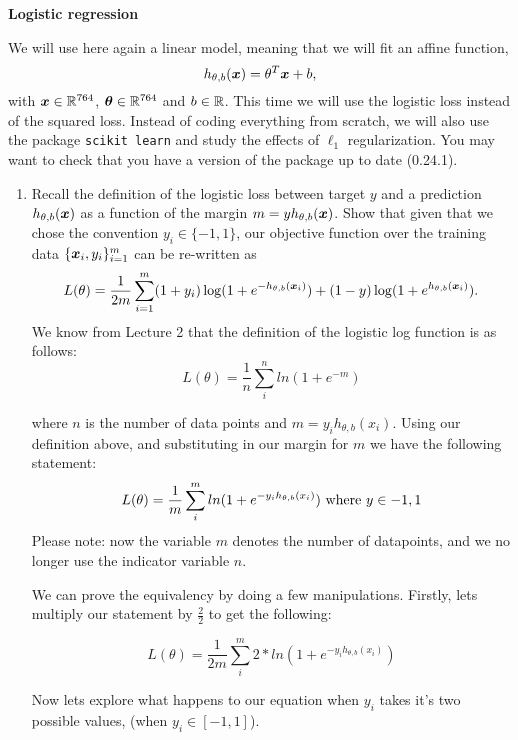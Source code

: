 \documentclass{article}
\begin{document}
{\color{nyupurple} \large \bf Logistic regression}  

We will use here again a linear model, meaning that we will fit an affine function,
\[
h_{\theta, b}(\boldsymbol{x}) = \theta^T\boldsymbol{x} + b,
\]
with $\boldsymbol{x} \in \mathbb{R}^{764}$, $\boldsymbol{\theta} \in \mathbb{R}^{764}$ and $b\in \mathbb{R}$.
This time we will use the logistic loss instead of the squared loss. Instead of coding everything from scratch, we will also use the package \texttt{scikit learn} and study the effects of $\ell_1$ regularization. You may want to check that you have a version of the package up to date (0.24.1).

\begin{enumerate}
\setcounter{enumi}{\value{saveenum}}
  \item Recall the definition of the logistic loss between target $y$ and a prediction $h_{\theta, b}(\boldsymbol{x})$ as a function of the margin $m = y h_{\theta, b}(\boldsymbol{x})$. Show that given that we chose the convention $y_i\in\{-1,1\}$, our objective function over the training data $\{\boldsymbol{x}_i, y_i\}_{i=1}^m$ can be re-written as
  \[
    L(\theta) = \frac 1 {2 m} \sum_{i=1}^m  (1 + y_i) \log ( 1 + e^{- h_{\theta, b}(\boldsymbol{x}_i)}) +  (1 - y) \log(1 + e^{h_{\theta, b}(\boldsymbol{x}_i)}).
    \]
\subitem
We know from Lecture 2 that the definition of the logistic log function is as follows:
$$ L(\theta) = \frac{1}{n}\sum_i^{n}ln(1 +e^{-m}) $$

    where $n$ is the number of data points and $ m =  y_i h_{\theta, b}(x_i) $. Using our definition above, and substituting in our margin for $m$ we have the following statement: 
    $$ L(\theta) = \frac{1}{m}\sum_i^{m}ln(1 +e^{-y_ih_{\theta, b}(x_i)}) \space \text{ where } \space y \space \in {-1,1}$$
    Please note: now the variable $m$ denotes the number of datapoints, and we no longer use the indicator variable $n$. 
    
    We can prove the equivalency by doing a few manipulations. Firstly, lets multiply our statement by $\frac{2}{2}$ to get the following:
    
    $$ L(\theta) = \frac{1}{2m}\sum_i^{m} 2*ln(1 +e^{-y_ih_{\theta, b}(x_i)})$$
    
    Now lets explore what happens to our equation when $y_i$ takes it's two possible values,  (when $y_i \in [-1,1]$). 
    

\end{enumerate}
\end{document}
